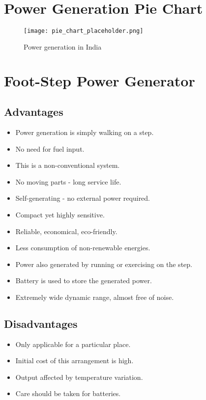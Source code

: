 \documentclass[12pt]{article}
\begin{document}
\section*{Power Generation Pie Chart}

\begin{figure}[h!]
    \centering
    \texttt{[image: pie\_chart\_placeholder.png]} %
    \caption{Power generation in India}
    \label{fig:pie_chart}
\end{figure}
\newpage 
\section*{Foot-Step Power Generator}

\subsection*{Advantages}
\begin{itemize}[noitemsep]
    \item Power generation is simply walking on a step.
    \item No need for fuel input.
    \item This is a non-conventional system.
    \item No moving parts - long service life.
    \item Self-generating - no external power required.
    \item Compact yet highly sensitive.
    \item Reliable, economical, eco-friendly.
    \item Less consumption of non-renewable energies.
    \item Power also generated by running or exercising on the step.
    \item Battery is used to store the generated power.
    \item Extremely wide dynamic range, almost free of noise.
\end{itemize}

\subsection*{Disadvantages}
\begin{itemize}[noitemsep]
    \item Only applicable for a particular place.
    \item Initial cost of this arrangement is high.
    \item Output affected by temperature variation.
    \item Care should be taken for batteries.
\end{itemize}
\newpage
\end{document}
